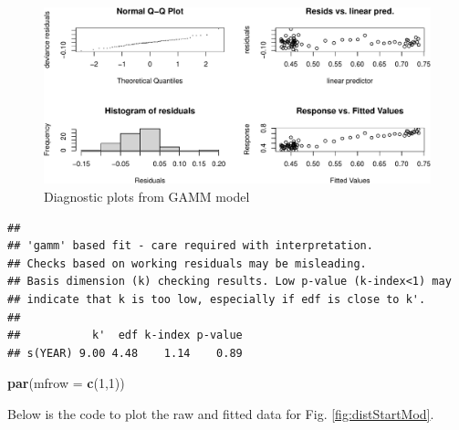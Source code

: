 \documentclass[nofonts,]{tufte-handout}
\newenvironment{Shaded}{\begin{snugshade}}{\end{snugshade}}
\newcommand{\AttributeTok}[1]{\textcolor[rgb]{0.13,0.29,0.53}{#1}}
\newcommand{\DecValTok}[1]{\textcolor[rgb]{0.00,0.00,0.81}{#1}}
\newcommand{\FunctionTok}[1]{\textcolor[rgb]{0.13,0.29,0.53}{\textbf{#1}}}
\newcommand{\NormalTok}[1]{#1}
\newcommand{\SpecialCharTok}[1]{\textcolor[rgb]{0.81,0.36,0.00}{\textbf{#1}}}
\newcommand{\StringTok}[1]{\textcolor[rgb]{0.31,0.60,0.02}{#1}}
\begin{document}
\begin{figure}
\includegraphics{Technical-supplement_files/figure-latex/distStartGAM-1} \caption[Diagnostic plots from GAMM model]{Diagnostic plots from GAMM model}\label{fig:distStartGAM}
\end{figure}

\begin{verbatim}
## 
## 'gamm' based fit - care required with interpretation.
## Checks based on working residuals may be misleading.
## Basis dimension (k) checking results. Low p-value (k-index<1) may
## indicate that k is too low, especially if edf is close to k'.
## 
##           k'  edf k-index p-value
## s(YEAR) 9.00 4.48    1.14    0.89
\end{verbatim}

\begin{Shaded}
\begin{Highlighting}[]
\FunctionTok{par}\NormalTok{(}\AttributeTok{mfrow =} \FunctionTok{c}\NormalTok{(}\DecValTok{1}\NormalTok{,}\DecValTok{1}\NormalTok{))}
\end{Highlighting}
\end{Shaded}

Below is the code to plot the raw and fitted data for Fig.
\ref{fig:distStartMod}.

\begin{Shaded}
\end{Shaded}
\end{document}
